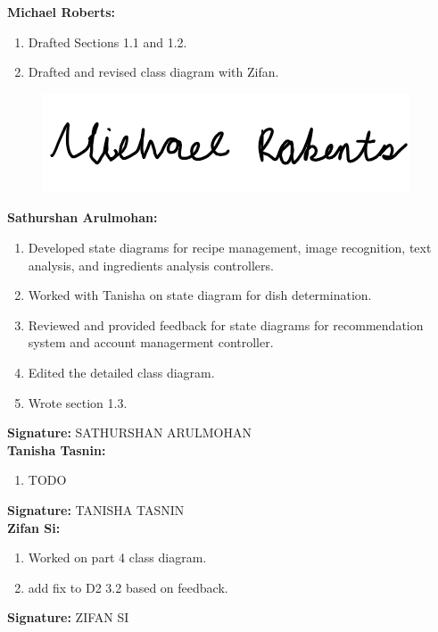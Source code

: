 \documentclass[]{article}
\begin{document}
\textbf{Michael Roberts:}
\begin{enumerate}
	\item Drafted Sections 1.1 and 1.2.
	\item Drafted and revised class diagram with Zifan.
\end{enumerate}

\begin{figure}[H]
 	\centering
    \includegraphics[width=\textwidth]{image/A_Michael_Roberts_Signature.png}
\end{figure}

\textbf{Sathurshan Arulmohan:}
\begin{enumerate}
	\item Developed state diagrams for recipe management, image recognition, text analysis, and ingredients analysis controllers.
	\item Worked with Tanisha on state diagram for dish determination.
	\item Reviewed and provided feedback for state diagrams for recommendation system and account managerment controller.
	\item Edited the detailed class diagram.
	\item Wrote section 1.3.
\end{enumerate}

\textbf{Signature:} SATHURSHAN ARULMOHAN \\

\textbf{Tanisha Tasnin:}
\begin{enumerate}
	\item TODO
\end{enumerate}

\textbf{Signature:} TANISHA TASNIN \\

\textbf{Zifan Si:}
\begin{enumerate}
	\item Worked on part 4 class diagram.
	\item add fix to D2 3.2 based on feedback.
\end{enumerate}

\textbf{Signature:} ZIFAN SI  \\
\end{document}
